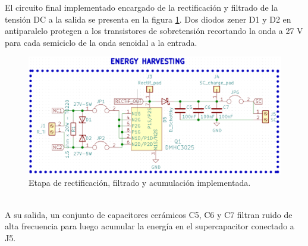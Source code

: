 El circuito final implementado encargado de la rectificación y filtrado de la tensión DC a la salida se presenta en la figura \ref{fig:ctorectificacionfiltrado}. Dos diodos zener D1 y D2 en antiparalelo protegen a los transistores de sobretensión recortando la onda a 27 V para cada semiciclo de la onda senoidal a la entrada.\\
\begin{figure}[h]
	\centering
	\includegraphics[width=1.0\linewidth]{Figures/cto_rectificacion_filtrado}
	\caption{Etapa de rectificación, filtrado y acumulación implementada.}
	\label{fig:ctorectificacionfiltrado}
\end{figure}\\
A su salida, un conjunto de capacitores cerámicos C5, C6 y C7 filtran ruido de alta frecuencia para luego acumular la energía en el supercapacitor conectado a J5.\\

